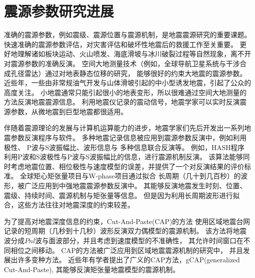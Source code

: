 



\section{震源参数研究进展}

准确的震源参数，例如震级、震源位置与震源机制，是地震震源研究的重要课题。
快速准确的震源参数评估，对灾害评估和破坏性地震后的救援工作至关重要。
更好地理解诸如板块运动、火山喷发、海底滑坡与冰川破裂过程等自然现象，离不开对震源参数的准确反演。
空间大地测量技术（例如，全球导航卫星系统与干涉合成孔径雷达）通过对地表静态位移的研究，
能够很好的约束大地震的震源参数\citep{Zha2011,Bathke2013,Vasyura-Bathke2020}。
近些年，一些由非常规油气开发与山体滑坡引起的中小型诱发地震，引起了公众的高度关注\citep{Ellsworth2013,Lei2017,Ruiz-Barajas2017,Zhao2020}。
小地震通常只能引起很小的地表变形，所以很难通过空间大地测量的方法反演地震震源信息。
利用地震仪记录的震动信号，地震学家可以实时反演震源参数，从微地震到巨型地震都很适用。

伴随着震源理论的发展与计算机运算能力的进步，地震学家们先后开发出一系列地震参数反演程序与软件。
多种地震记录信息被应用到震源参数反演中，例如利用极性\citep{Hardebeck2002}、
P波与S波振幅比\citep{Reasenberg1985,Hardebeck2003}、波形信息\citep{Dziewonski1981,Dreger1993}与
多种信息联合反演\citep{Li2011,Tan2018}等。
例如，HASH\citep{Hardebeck2002,Hardebeck2003}程序利用P波和S波极性与P波与S波振幅比的信息，进行震源机制反演。
该算法能够同时考虑地震位置、相位极性与速度模型的误差，并提供了一个对反演结果的评价标准。
全球矩心矩张量项目\citep{Dziewonski1981}与W-phase项目\citep{Kanamori1993}通过拟合
长周期（几十到几百秒）的波形，被广泛应用到中强地震震源参数反演中。
其能够反演地震发生时刻、位置、震级、持续时间、震源机制与矩张量等信息。
但是因为利用长周期波形进行拟合，这些方法往往对地震深度的约束较差。

为了提高对地震深度信息的约束，Cut-And-Paste(CAP)的方法\citep{Zhao1994,Zhu1996}
使用区域地震台网记录的短周期（几秒到十几秒）波形反演双力偶模型的震源机制。
该方法将地震波分成$Pnl$波与面波部分，并且考虑到速度模型的不准确性，
其允许时间窗口在不同相位之间移动。
CAP的方法被广泛应用到区域地震震源机制的研究中\citep{DAmico2011,Ross2015,Zhu2016,Tang2018,Li2020}，
并且发展出许多变种方法\citep{Chen2015,Bai2020a}。
近些年有学者提出了广义的CAP方法\citep{Zhu2013}，gCAP(generalized Cut-And-Paste),
其能够反演矩张量地震模型的震源机制。



